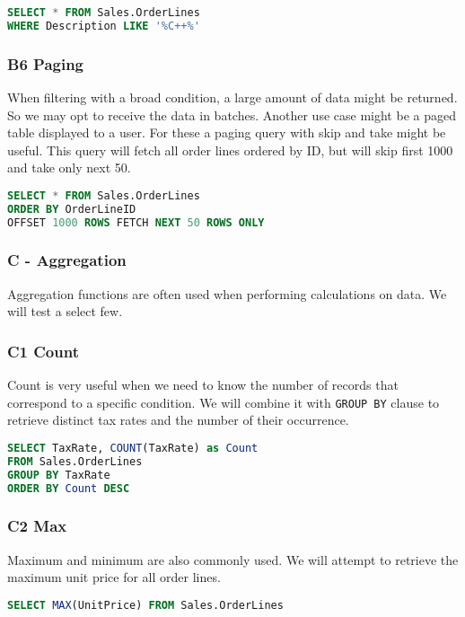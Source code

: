 \begin{lstlisting}[language=SQL]
SELECT * FROM Sales.OrderLines 
WHERE Description LIKE '%C++%'
\end{lstlisting}

\subsubsection*{B6 Paging} \label{query:b6}
When filtering with a broad condition, a large amount of data might be returned. So we may opt to receive the data in batches. Another use case might be a paged table displayed to a user. For these a paging query with skip and take might be useful.
This query will fetch all order lines ordered by ID, but will skip first 1000 and take only next 50.

\begin{lstlisting}[language=SQL]
SELECT * FROM Sales.OrderLines 
ORDER BY OrderLineID 
OFFSET 1000 ROWS FETCH NEXT 50 ROWS ONLY
\end{lstlisting}

\subsubsection{C - Aggregation} \label{query:}
Aggregation functions are often used when performing calculations on data. We will test a select few.

\subsubsection*{C1 Count} \label{query:c1}
Count is very useful when we need to know the number of records that correspond to a specific condition. We will combine it with \texttt{GROUP BY} clause to retrieve distinct tax rates and the number of their occurrence.

\begin{lstlisting}[language=SQL]
SELECT TaxRate, COUNT(TaxRate) as Count 
FROM Sales.OrderLines 
GROUP BY TaxRate 
ORDER BY Count DESC
\end{lstlisting}

\subsubsection*{C2 Max}  \label{query:c2}
Maximum and minimum are also commonly used. We will attempt to retrieve the maximum unit price for all order lines.

\begin{lstlisting}[language=SQL]
SELECT MAX(UnitPrice) FROM Sales.OrderLines
\end{lstlisting}

